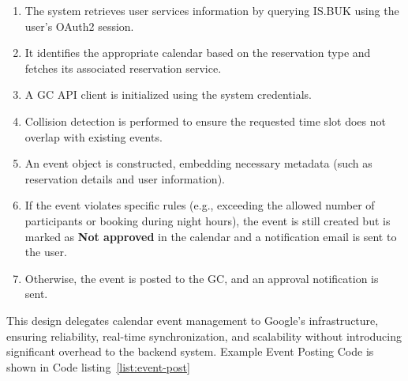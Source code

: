 \begin{enumerate}
\item The system retrieves user services information by querying IS.BUK using the user’s OAuth2 session.
\item It identifies the appropriate calendar based on the reservation type and fetches its associated reservation service.
\item A GC API client is initialized using the system credentials.
\item Collision detection is performed to ensure the requested time slot does not overlap with existing events.
\item An event object is constructed, embedding necessary metadata (such as reservation details and user information).
\item If the event violates specific rules (e.g., exceeding the allowed number of participants or booking during night hours), the event is still created but is marked as \textbf{Not approved} in the calendar and a notification email is sent to the user.
\item Otherwise, the event is posted to the GC, and an approval notification is sent.
\end{enumerate}

This design delegates calendar event management to Google’s infrastructure, ensuring reliability, real-time synchronization, and scalability without introducing significant overhead to the backend system. Example Event Posting Code is shown in Code listing~\ref{list:event-post}

